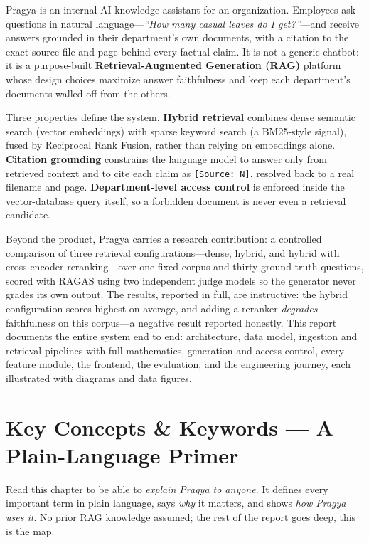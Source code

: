 \documentclass[11pt,a4paper,oneside]{report}
\newcommand{\code}[1]{\texttt{#1}}
\begin{document}
Pragya is an internal AI knowledge assistant for an organization. Employees ask questions
in natural language---\emph{``How many casual leaves do I get?''}---and receive answers
grounded in their department's own documents, with a citation to the exact source file and
page behind every factual claim. It is not a generic chatbot: it is a purpose-built
\textbf{Retrieval-Augmented Generation (RAG)} platform whose design choices maximize answer
faithfulness and keep each department's documents walled off from the others.

Three properties define the system. \textbf{Hybrid retrieval} combines dense semantic search
(vector embeddings) with sparse keyword search (a BM25-style signal), fused by Reciprocal
Rank Fusion, rather than relying on embeddings alone. \textbf{Citation grounding} constrains
the language model to answer only from retrieved context and to cite each claim as
\code{[Source: N]}, resolved back to a real filename and page. \textbf{Department-level
access control} is enforced inside the vector-database query itself, so a forbidden document
is never even a retrieval candidate.

Beyond the product, Pragya carries a research contribution: a controlled comparison of three
retrieval configurations---dense, hybrid, and hybrid with cross-encoder reranking---over one
fixed corpus and thirty ground-truth questions, scored with RAGAS using two independent judge
models so the generator never grades its own output. The results, reported in full, are
instructive: the hybrid configuration scores highest on average, and adding a reranker
\emph{degrades} faithfulness on this corpus---a negative result reported honestly. This
report documents the entire system end to end: architecture, data model, ingestion and
retrieval pipelines with full mathematics, generation and access control, every feature
module, the frontend, the evaluation, and the engineering journey, each illustrated with
diagrams and data figures.

\tableofcontents
\listoffigures
\listoftables

\chapter{Key Concepts \& Keywords --- A Plain-Language Primer}
\begin{keyidea}
Read this chapter to be able to \emph{explain Pragya to anyone}. It defines every important term in
plain language, says \emph{why} it matters, and shows \emph{how Pragya uses it}. No prior RAG knowledge
assumed; the rest of the report goes deep, this is the map.
\end{keyidea}
\end{document}
